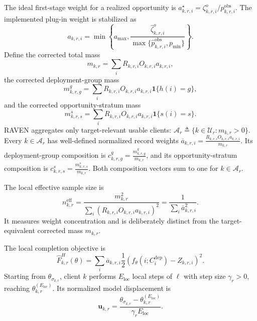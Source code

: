 \documentclass[letterpaper,journal]{IEEEtran}
\begin{document}
The ideal first-stage weight for a realized opportunity is
$a^\star_{k,r,i}=\zeta^{o}_{k,r,i}/p^{\mathrm{obs}}_{k,r,i}$.
The implemented plug-in weight is stabilized as
\begin{equation}
 a_{k,r,i}
 =
 \min\!\left\{
 a_{\max},
 \frac{\widehat\zeta^{o}_{k,r,i}}
 {\max\{\widehat p^{\mathrm{obs}}_{k,r,i},p_{\min}\}}
 \right\}.
 \label{eq:a_stabilized}
\end{equation}
Define the corrected total mass
\begin{equation}
    m_{k,r}
    =
    \sum_i
    R_{k,r,i}O_{k,r,i}a_{k,r,i},
    \label{eq:m_total}
\end{equation}
the corrected deployment-group mass
\begin{equation}
 m^{g}_{k,r,g}
 =
 \sum_i
 R_{k,r,i}O_{k,r,i}a_{k,r,i}
 \mathbf{1}\{h(i)=g\},
 \label{eq:m_group}
\end{equation}
and the corrected opportunity-stratum mass
\begin{equation}
 m^{s}_{k,r,s}
 =
 \sum_i
 R_{k,r,i}O_{k,r,i}a_{k,r,i}
 \mathbf{1}\{s(i)=s\}.
 \label{eq:m_stratum}
\end{equation}
RAVEN aggregates only target-relevant usable clients:
$\mathcal{A}_r\triangleq\{k\in\mathcal{U}_r:m_{k,r}>0\}$.
Every $k\in\mathcal{A}_r$ has well-defined normalized record weights
$\overline a_{k,r,i}=\frac{R_{k,r,i}O_{k,r,i}a_{k,r,i}}{m_{k,r}}$.
Its deployment-group composition is
$c^{g}_{k,r,g}=\frac{m^{g}_{k,r,g}}{m_{k,r}}$, and its
opportunity-stratum composition is
$c^{s}_{k,r,s}=\frac{m^{s}_{k,r,s}}{m_{k,r}}$.
Both composition vectors sum to one for $k\in\mathcal{A}_r$.

The local effective sample size is
\begin{equation}
 n^{\mathrm{eff}}_{k,r}
 =
 \frac{m_{k,r}^2}
 {\sum_i
  (R_{k,r,i}O_{k,r,i}a_{k,r,i})^2}
 =
 \frac{1}{\sum_i\overline a_{k,r,i}^2}.
 \label{eq:neff}
\end{equation}
It measures weight concentration and is deliberately distinct from the
target-equivalent corrected mass $m_{k,r}$.

The local completion objective is
\begin{equation}
 \widehat F^{H}_{k,r}(\theta)
 =
 \sum_i
 \overline a_{k,r,i}
 \frac{1}{2}
 \left(
 f_{\theta}(i;C_i^{\mathrm{dep}})
 -
 Z_{k,r,i}
 \right)^2.
 \label{eq:local_hajek_objective}
\end{equation}
Starting from $\theta_{\sigma_{k,r}}$, client $k$ performs
$E_{\mathrm{loc}}$ local steps of $\ell$ with step size $\gamma_r>0$, reaching
$\theta^{(E_{\mathrm{loc}})}_{k,r}$.  Its normalized model
displacement is
\begin{equation}
 \mathbf{u}_{k,r}
 =
 \frac{
 \theta_{\sigma_{k,r}}
 -
 \theta^{(E_{\mathrm{loc}})}_{k,r}
 }{\gamma_r E_{\mathrm{loc}}}.
 \label{eq:normalized_update}
\end{equation}
\end{document}
